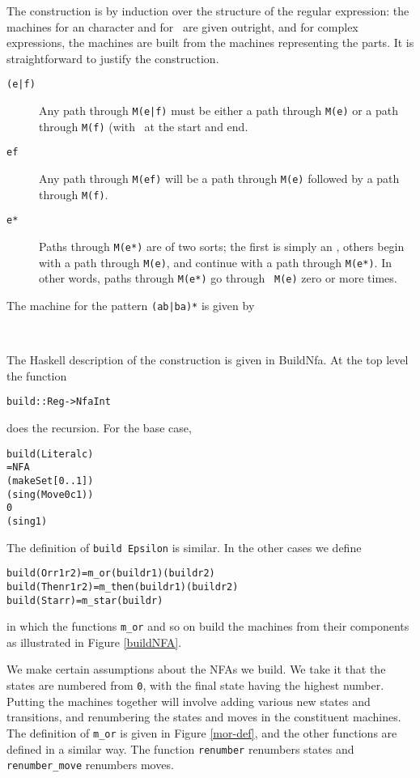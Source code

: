\documentclass[11pt]{article}
\begin{document}
The construction is by induction over the structure of the regular expression:
the machines for an character and for \eps\ are given outright, and for
complex expressions, the machines are built from the machines representing the
parts. It is straightforward
to justify the construction.
\begin{description}
\item[\tt (e|f)] Any path through {\tt M(e|f)}
must be either a path through {\tt M(e)} or a path through {\tt M(f)} (with 
\eps\ at the start and end.
\item[\tt ef] Any path through {\tt M(ef)} will be a path through {\tt M(e)}
followed by a path through {\tt M(f)}.
\item[\tt e*] Paths through {\tt M(e*)} are of two sorts; the first is simply
an \eps, others begin with a path through {\tt M(e)}, and continue with a path
through {\tt M(e*)}. In other words, paths through {\tt M(e*)} go through {\tt
M(e)} zero or more times.
\end{description}
The machine for the pattern {\tt (ab|ba)*} is given by
\noindent
\begin{center}\  \end{center}
The Haskell description of the construction is given in {BuildNfa}. At
the top level the function 

\begin{alltt}
build :: Reg -> Nfa Int
\end{alltt} 
does the recursion. For the base case,

\begin{alltt}
build (Literal c)
  = NFA
    (makeSet [0 .. 1])
    (sing (Move 0 c 1))
    0
    (sing 1)
\end{alltt}
The definition of {\tt build Epsilon} is similar. In the other cases
we define

\begin{alltt}
build (Or r1 r2)   = m\_or   (build r1) (build r2)
build (Then r1 r2) = m\_then (build r1) (build r2)
build (Star r)     = m\_star (build r)
\end{alltt}
in which the functions {\tt m\_or} and so on build the machines from their
components as illustrated in Figure \ref{buildNFA}.

We make certain assumptions
about the NFAs we build. We take it that the states are numbered from {\tt 0},
with the final state having the highest number. Putting the machines together
will involve adding various new states and transitions, and renumbering the
states and moves in the constituent machines. The definition
of \texttt{m\_or} is given in Figure \ref{mor-def}, and the other functions are defined
in a similar way. 
The function {\tt renumber} renumbers states and {\tt renumber\_move} renumbers
moves.
\end{document}
